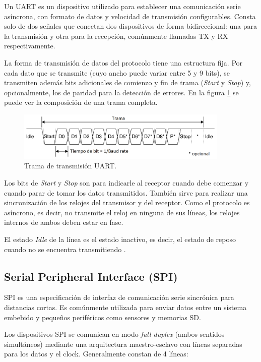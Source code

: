 Un UART es un dispositivo utilizado para establecer una comunicación serie asíncrona, con formato de datos y velocidad de transmisión configurables. Consta solo de dos señales que conectan dos dispositivos de forma bidireccional: una para la transmisión y otra para la recepción, comúnmente llamadas TX y RX respectivamente.

La forma de transmisión de datos del protocolo tiene una estructura fija. Por cada dato que se transmite (cuyo ancho puede variar entre 5 y 9 bits), se transmiten además bits adicionales de comienzo y fin de trama (\textit{Start} y \textit{Stop}) y, opcionalmente, los de paridad para la detección de errores. En la figura \ref{fig:transUART} se puede ver la composición de una trama completa.

\begin{figure}[H]
\centering
\includegraphics[width=0.9\textwidth]{./Figures/UART_frame.png}
\caption{Trama de transmisión UART.}
\label{fig:transUART}
\end{figure}

Los bits de \textit{Start} y \textit{Stop} son para indicarle al receptor cuando debe comenzar y cuando parar de tomar los datos transmitidos. También sirve para realizar una sincronización de los relojes del transmisor y del receptor. Como el protocolo es asíncrono, es decir, no transmite el reloj en ninguna de sus líneas, los relojes internos de ambos deben estar en fase.

El estado \textit{Idle} de la línea es el estado inactivo, es decir, el estado de reposo cuando no se encuentra transmitiendo \citep{WEBSITE:3}.

\subsection{Serial Peripheral Interface (SPI)}

SPI es una especificación de interfaz de comunicación serie sincrónica para distancias cortas. Es comúnmente utilizada para enviar datos entre un sistema embebido y pequeños periféricos como sensores y memorias SD.

Los dispositivos SPI se comunican en modo \textit{full duplex} (ambos sentidos simultáneos) mediante una arquitectura maestro-esclavo con líneas separadas para los datos y el clock. Generalmente constan de 4 líneas:

